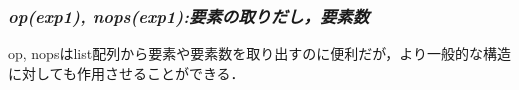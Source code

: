 \documentclass{article}
\begin{document}
\subsubsection{\textit{op(exp1), nops(exp1):}\textit{要素の取りだし，要素数}}
\begin{maplegroup}
\begin{Maple Normal}{
op, nopsはlist配列から要素や要素数を取り出すのに便利だが，より一般的な構造に対しても作用させることができる．}\end{Maple Normal}

\end{maplegroup}
\begin{maplegroup}
\begin{mapleinput}
\end{mapleinput}
\mapleresult
\begin{maplelatex}
\end{maplelatex}
\end{maplegroup}
\begin{maplegroup}
\begin{mapleinput}
\end{mapleinput}
\mapleresult
\begin{maplelatex}
\end{maplelatex}
\end{maplegroup}
\end{document}
